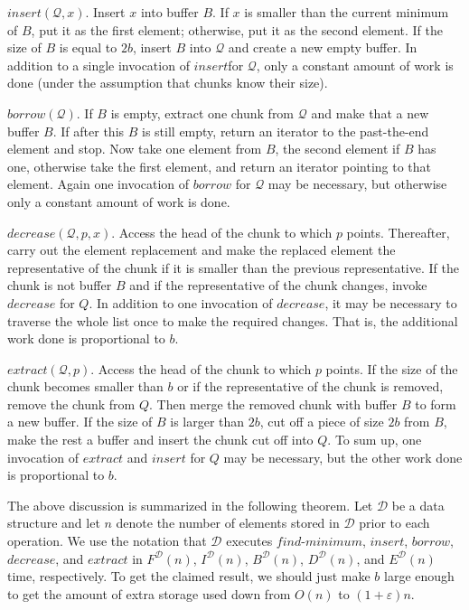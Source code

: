 \documentclass{DIKU-article}
\newcommand{\Findmin}{\mbox{$\mathit{find}$\textnormal{-}}\allowbreak{}\mbox{$\mathit{minimum}$}}
\newcommand{\Insert}{\mbox{$\mathit{insert}$}}
\newcommand{\Extract}{\mbox{$\mathit{extract}$}}
\newcommand{\Decrease}{\mbox{$\mathit{decrease}$}}
\newcommand{\Borrow}{\mbox{$\mathit{borrow}$}}
\begin{document}
\Insert{}$(\mathcal{Q}, x)$. Insert $x$ into buffer $B$. If $x$ is smaller than
the current minimum of $B$, put it as the first element; otherwise, put it as
the second element. If the size of $B$ is equal to $2b$, insert
$B$ into $\mathcal{Q}$ and create a new empty buffer. In addition to a single
invocation of \Insert for $\mathcal{Q}$, only a constant amount of
work is done (under the assumption that chunks know their size).

\Borrow{}$(\mathcal{Q})$. If $B$ is empty, extract one chunk from
$\mathcal{Q}$ and make that a new buffer $B$. If after this $B$ is
still empty, return an iterator to the past-the-end element and
stop. Now take one element from $B$, the second element if $B$ has
one, otherwise take the first element, and return an iterator pointing
to that element. Again one invocation of \Borrow{} for $\mathcal{Q}$
may be necessary, but otherwise only a constant amount of work is
done.

\Decrease{}$(\mathcal{Q}, p, x)$. Access the head of the chunk to
which $p$ points. Thereafter, carry out the element replacement and
make the replaced element the representative of the chunk if it is
smaller than the previous representative. If the chunk is not buffer
$B$ and if the representative of the chunk changes, invoke
\Decrease{} for $Q$. In addition to one invocation of \Decrease{}, it
may be necessary to traverse the
whole list once to make the required changes. That is, the additional
work done is proportional to $b$.

\Extract{}$(\mathcal{Q}, p)$. Access the head of the chunk to which
$p$ points. If the size of the chunk becomes smaller than $b$ or if
the representative of the chunk is removed, remove the chunk from
$Q$. Then merge the removed chunk with buffer $B$ to form a new
buffer. If the size of $B$ is larger than $2b$, cut off a piece of
size $2b$ from $B$, make the rest a buffer and insert the chunk cut
off into $Q$. To sum up, one invocation of \Extract{} and \Insert{} for
$Q$ may be necessary, but the other work done is proportional to $b$.

The above discussion is summarized in the following theorem.  Let
$\mathcal{D}$ be a data structure and let $n$ denote the number of
elements stored in $\mathcal{D}$ prior to each operation.  We use the
notation that $\mathcal{D}$ executes \Findmin{}, \Insert{},
\Borrow{}, \Decrease{}, and \Extract{} in 
$F^{\mathcal{D}}(n)$,
$I^{\mathcal{D}}(n)$, 
$B^{\mathcal{D}}(n)$, 
$D^{\mathcal{D}}(n)$, and
$E^{\mathcal{D}}(n)$ time, respectively. To get the claimed result, we
should just make $b$ large enough to get the amount of extra storage
used down from $O(n)$ to $(1+\varepsilon)n$.
\end{document}
